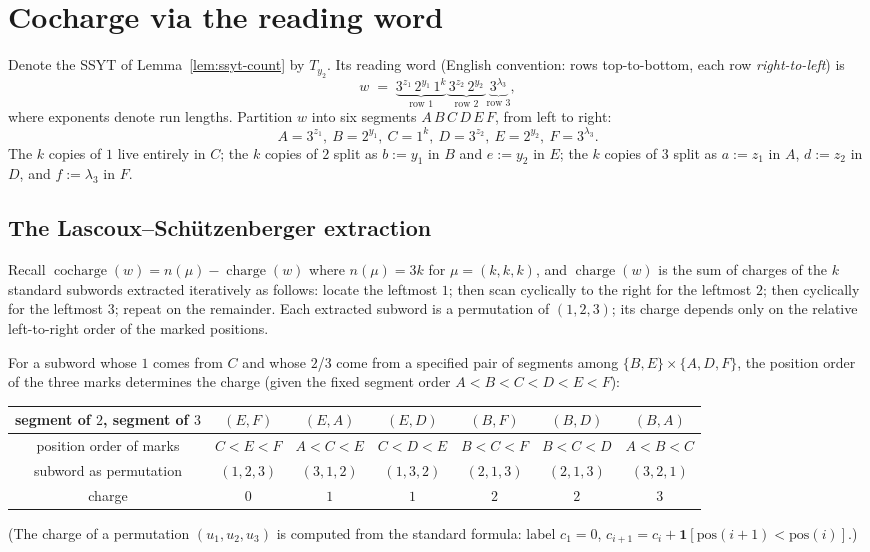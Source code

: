 \documentclass[11pt]{article}
\theoremstyle{definition}
\theoremstyle{remark}
\DeclareMathOperator{\cocharge}{cocharge}
\DeclareMathOperator{\charge}{charge}
\begin{document}
\section{Cocharge via the reading word}

Denote the SSYT of Lemma~\ref{lem:ssyt-count} by $T_{y_2}$. Its reading
word (English convention: rows top-to-bottom, each row \emph{right-to-left}) is
\[
    w \;=\; \underbrace{3^{z_1}\,2^{y_1}\,1^{k}}_{\text{row }1}\,
            \underbrace{3^{z_2}\,2^{y_2}}_{\text{row }2}\,
            \underbrace{3^{\lambda_3}}_{\text{row }3},
\]
where exponents denote run lengths. Partition $w$ into six segments
$A\,B\,C\,D\,E\,F$, from left to right:
\[
    A = 3^{z_1},\ B = 2^{y_1},\ C = 1^{k},\ D = 3^{z_2},\ E = 2^{y_2},\
    F = 3^{\lambda_3}.
\]
The $k$ copies of $1$ live entirely in $C$; the $k$ copies of $2$ split as
$b := y_1$ in $B$ and $e := y_2$ in $E$; the $k$ copies of $3$ split as
$a := z_1$ in $A$, $d := z_2$ in $D$, and $f := \lambda_3$ in $F$.

\subsection*{The Lascoux--Sch\"utzenberger extraction}

Recall $\cocharge(w) = n(\mu) - \charge(w)$ where $n(\mu)= 3k$ for
$\mu = (k,k,k)$, and $\charge(w)$ is the sum of charges of the $k$
standard subwords extracted iteratively as follows: locate the leftmost
$1$; then scan cyclically to the right for the leftmost $2$; then
cyclically for the leftmost $3$; repeat on the remainder. Each extracted
subword is a permutation of $(1,2,3)$; its charge depends only on the
relative left-to-right order of the marked positions.

For a subword whose $1$ comes from $C$ and whose $2$/$3$ come from a
specified pair of segments among $\{B,E\}\times\{A,D,F\}$, the position
order of the three marks determines the charge (given the fixed segment
order $A\!<\!B\!<\!C\!<\!D\!<\!E\!<\!F$):
\begin{center}
\begin{tabular}{c|cccccc}
segment of $2$, segment of $3$ &
$(E,F)$ & $(E,A)$ & $(E,D)$ & $(B,F)$ & $(B,D)$ & $(B,A)$ \\ \hline
position order of marks &
$C\!<\!E\!<\!F$ & $A\!<\!C\!<\!E$ & $C\!<\!D\!<\!E$ &
$B\!<\!C\!<\!F$ & $B\!<\!C\!<\!D$ & $A\!<\!B\!<\!C$ \\
subword as permutation &
$(1,2,3)$ & $(3,1,2)$ & $(1,3,2)$ & $(2,1,3)$ & $(2,1,3)$ & $(3,2,1)$ \\
charge &
$0$ & $1$ & $1$ & $2$ & $2$ & $3$
\end{tabular}
\end{center}
(The charge of a permutation $(u_1,u_2,u_3)$ is computed from the standard
formula: label $c_1 = 0$, $c_{i+1} = c_i + \mathbf 1[\text{pos}(i+1) <
\text{pos}(i)]$.)
\end{document}
